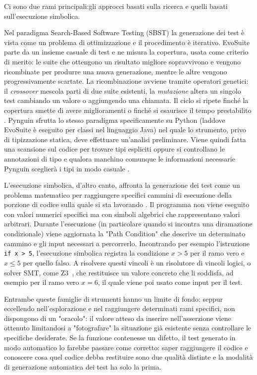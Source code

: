 Ci sono due rami principali:gli approcci basati sulla ricerca e quelli basati sull'esecuzione simbolica.

Nel paradigma Search-Based Software Testing (SBST) la generazione dei test è vista come un problema di ottimizzazione e il procedimento è iterativo. EvoSuite parte da un insieme casuale di test e ne misura la copertura, usata come criterio di merito: le suite che ottengono un risultato migliore sopravvivono e vengono ricombinate per produrre una nuova generazione, mentre le altre vengono progressivamente scartate. La ricombinazione avviene tramite operatori genetici: il \emph{crossover} mescola parti di due suite esistenti, la \emph{mutazione} altera un singolo test cambiando un valore o aggiungendo una chiamata. Il ciclo si ripete finché la copertura smette di avere miglioramenti o finché si esaurisce il tempo prestabilito \cite{fraser2011evosuite}. Pynguin sfrutta lo stesso paradigma specificamente su Python (laddove EvoSuite è eseguito per classi nel linguaggio Java) nel quale lo strumento, privo di tipizzazione statica, deve effettuare un'analisi preliminare. Viene quindi fatta una scansione sul codice per trovare tipi espliciti oppure si controllano le annotazioni di tipo e qualora manchino comunque le informazioni necessarie Pynguin sceglierà i tipi in modo casuale \cite{lukasczyk2022pynguin}.

L'esecuzione simbolica, d'altro canto, affronta la generazione dei test come un problema matematico per raggiungere specifici cammini di esecuzione della porzione di codice sulla quale si sta lavorando \cite{king1976symbolic}. Il programma non viene eseguito con valori numerici specifici ma con simboli algebrici che rappresentano valori arbitrari. Durante l'esecuzione (in particolare quando si incontra una diramazione condizionale) viene aggiornata la "Path Condition" che descrive un determinato cammino e gli input necessari a percorrerlo. Incontrando per esempio l'istruzione \texttt{if x > 5}, l'esecuzione simbolica registra la condizione $x > 5$ per il ramo vero e $x \leq 5$ per quello falso. A risolvere questi vincoli è un risolutore di vincoli logici, o solver SMT, come Z3~\cite{demoura2008z}, che restituisce un valore concreto che li soddisfa, ad esempio per il ramo vero $x = 6$, il quale viene poi usato come input per il test.

Entrambe queste famiglie di strumenti hanno un limite di fondo: seppur eccellendo nell'esplorazione e nel raggiungere determinati rami specifici, non dispongono di un "oracolo": il valore atteso da inserire nell'asserzione viene ottenuto limitandosi a "fotografare" la situazione già esistente senza controllare le specifiche desiderate. Se la funzione contenesse un difetto, il test generato in modo automatico lo farebbe passare come corretto: saper raggiungere il codice e conoscere cosa quel codice debba restituire sono due qualità distinte e la modalità di generazione automatica dei test ha solo la prima.


